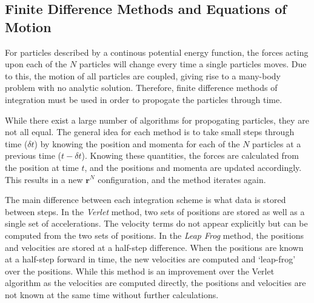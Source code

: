 \subsection{Finite Difference Methods and Equations of Motion}
For particles described by a continous potential energy function, the
forces acting upon each of the $N$ particles will change every time a
single particles moves. Due to this, the motion of all particles are
coupled, giving rise to a many-body problem with no analytic
solution. Therefore, finite difference methods of integration must be
used in order to propogate the particles through time.

While there exist a large number of algorithms for propogating
particles, they are not all equal. The general idea for each method is
to take small steps through time ($\delta t$) by knowing the position
and momenta for each of the $N$ particles at a previous time
($t-\delta t$). Knowing these quantities, the forces are calculated
from the position at time $t$, and the positions and momenta are updated
accordingly. This results in a new $\mathbf{r}^N$ configuration, and
the method iterates again.

The main difference between each integration scheme is what data is
stored between steps. In the \textit{Verlet} method, two sets of
positions are stored as well as a single set of accelerations. The
velocity terms do not appear explicitly but can be computed from the
two sets of positions. In the \textit{Leap Frog} method, the positions
and velocities are stored at a half-step difference. When the
positions are known at a half-step forward in time, the new velocities are
computed and `leap-frog' over the positions. While this method is an
improvement over the Verlet algorithm as the velocities are computed
directly, the positions and velocities are not known at the same time
without further calculations.

